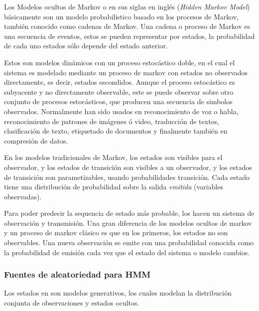 
Los Modelos ocultos de Markov o en sus siglas en inglés \HMM (\emph{Hidden Markov Model})  básicamente son un modelo probabilistico basado en los procesos de Markov, también conocido como cadenas de Markov. Una cadena o proceso de Markov es una secuencia de eventos, estos se pueden representar por estados, la probabilidad de cada uno estados sólo depende del estado anterior.


Estos \HMM son modelos dinámicos con un proceso estocástico doble, en el cual el sistema es modelado mediante un proceso de markov con estados no observados directamente, es decir, estados escondidos. Aunque el proceso estocástico es subyacente y no directamente observable, este se puede observar sobre otro conjunto de procesos estocásticos, que producen una secuencia de simbolos observados. Normalmente han sido usados en reconocimiento de voz o habla, reconocimiento de patrones de imágenes ó video, traducción de textos, clasificación de texto, etiquetado de documentos y finalmente también en compresión de datos.

En los modelos tradicionales de Markov, los estados son visibles para el observador, y los estados de transición son visibles a un observador, y los estados de transición son parametizables, usando probabilidades transición. Cada estado tiene una distribución de probabilidad sobre la salida \emph{emitida} (variables observadas).






Para poder predecir la sequencia de estado más probable, los \HMM hacen un sistema de observación y transmisión. Una gran diferencia de los modelos ocultos de markov y un proceso de markov clásico es que en los primeros, los estados no son observables.  Una nueva observación se emite con una probabilidad conocida como la probabilidad de emisión cada vez que el estado del sistema o modelo cambios. 

\subsubsection{Fuentes de aleatoriedad para HMM}

Los estados en \HMM son modelos generativos, los cuales modelan la distribución conjunta de  observaciones y estados ocultos.

